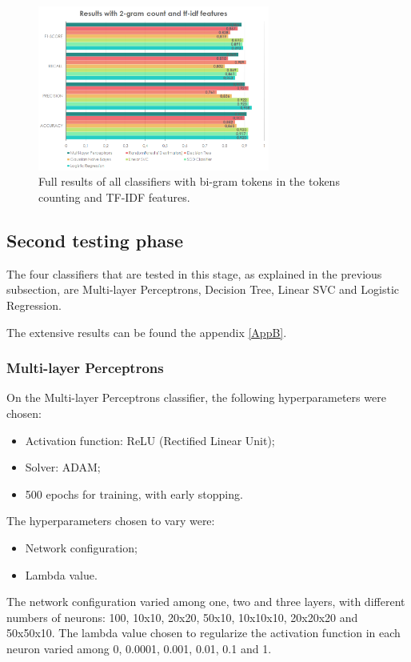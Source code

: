\documentclass[journal]{IEEEtran}
\begin{document}
\begin{figure}[!t]
\centering
\includegraphics[width=3in]{AllClassifiers2GramIDF_w}
\caption{Full results of all classifiers with bi-gram tokens in the tokens counting and TF-IDF features.}
\label{AllClassifiers2GramIDF}
\end{figure}


\subsection{Second testing phase}

The four classifiers that are tested in this stage, as explained in the previous subsection, are Multi-layer Perceptrons, Decision Tree, Linear SVC and Logistic Regression.

The extensive results can be found the appendix \ref{AppB}.

\subsubsection{Multi-layer Perceptrons}
On the Multi-layer Perceptrons classifier, the following hyperparameters were chosen:
\begin{itemize}
\item Activation function: ReLU (Rectified Linear Unit);
\item Solver: ADAM;
\item 500 epochs for training, with early stopping.
\end{itemize}

The hyperparameters chosen to vary were:
\begin{itemize}
\item Network configuration;
\item Lambda value.
\end{itemize}

The network configuration varied among one, two and three layers, with different numbers of neurons: 100, 10x10, 20x20, 50x10, 10x10x10, 20x20x20 and 50x50x10. The lambda value chosen to regularize the activation function in each neuron varied among 0, 0.0001, 0.001, 0.01, 0.1 and 1.
\end{document}
